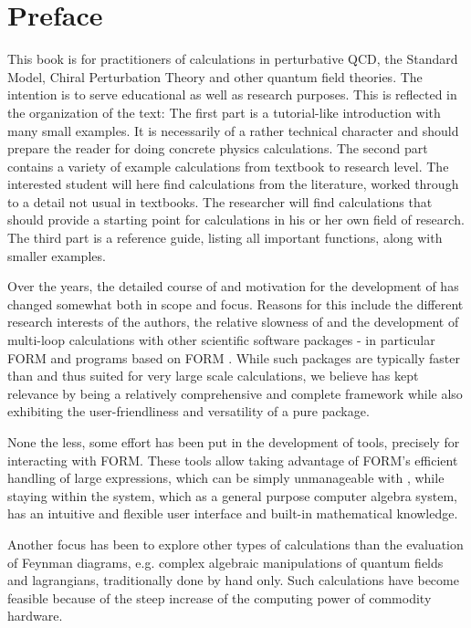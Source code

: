 \section*{Preface}

This book is for practitioners of calculations in perturbative QCD,
the Standard Model, Chiral Perturbation Theory and other quantum field theories.
The intention is to serve educational as well as research purposes.
This is reflected in the organization of the text:
The first part is a tutorial-like introduction with many small examples.
It is necessarily of a rather technical character and should prepare the
reader for doing concrete physics calculations.
The second part contains a variety of example calculations from textbook
to research level. The interested student will here find calculations 
from the literature, worked through to a detail not usual in textbooks.
The researcher will find calculations that should provide a starting point
for calculations in his or her own field of research.
The third part is a reference guide, listing all important functions,
along with smaller examples.

Over the years, the detailed course of and motivation for the development of \fc has
changed somewhat both in scope and focus. Reasons for this include the
different research interests of the authors, the relative slowness of \mma and the development of
multi-loop calculations with other scientific software packages - in
particular FORM and programs based on FORM \cite{Vermaseren:2000nd,
Hahn:1998yk}. While such packages are typically faster than \fc and thus suited
for very large scale calculations, we believe \fc has kept relevance by being a
relatively comprehensive and complete framework while also exhibiting the
user-friendliness and versatility of a pure \mma package.

None the less, some effort has been put in the development of \fc tools,
precisely for interacting with FORM.
These tools allow taking advantage of FORM's efficient handling of large expressions, which can be simply
unmanageable with \mma, while staying within the \mma system, which as a
general purpose computer algebra system, has an intuitive and flexible
user interface and built-in mathematical knowledge.

Another focus has been to explore other types of calculations than the evaluation of Feynman
diagrams, e.g. complex algebraic manipulations of quantum fields and lagrangians, traditionally done by hand only.
Such calculations have become feasible because of the steep increase of the
computing power of commodity hardware.

